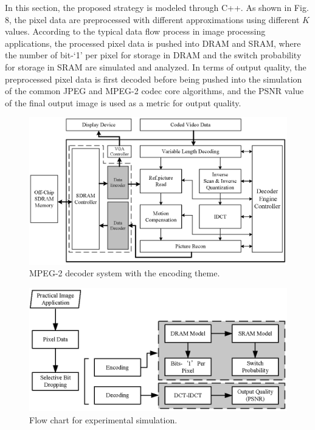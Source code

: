 \documentclass[lettersize,journal]{IEEEtran}
\begin{document}
In this section, the proposed strategy is modeled through C++. As shown in Fig. 8, the pixel data are preprocessed with different approximations using different $K$ values. According to the typical data flow process in image processing applications, the processed pixel data is pushed into DRAM and SRAM, where the number of bit-`1' per pixel for storage in DRAM and the switch probability for storage in SRAM are simulated and analyzed. In terms of output quality, the preprocessed pixel data is first decoded before being pushed into the simulation of the common JPEG and MPEG-2 codec core algorithms, and the PSNR value of the final output image is used as a metric for output quality.


\begin{figure}[htb]
	\centering
	\includegraphics[width=\linewidth]{Fig/MPEG-2.png}
	{\color{red}\caption{MPEG-2 decoder system with the encoding theme.}}
	\label{fig7}
\end{figure}

\begin{figure}[htb]
	\centering
	\includegraphics[width=\linewidth]{Fig/Flow chart for experimental simulation.png}
	\caption{Flow chart for experimental simulation.}
	\label{fig8}
\end{figure}
\end{document}
